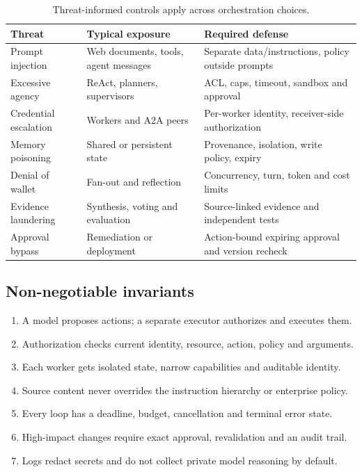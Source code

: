 \begin{table}[htbp]\small\centering
\begin{tabularx}{\linewidth}{@{}p{25mm}Y Y@{}}\toprule
\textbf{Threat} & \textbf{Typical exposure} & \textbf{Required defense}\\\midrule
Prompt injection & Web documents, tools, agent messages & Separate data/instructions, policy outside prompts\\
Excessive agency & ReAct, planners, supervisors & ACL, caps, timeout, sandbox and approval\\
Credential escalation & Workers and A2A peers & Per-worker identity, receiver-side authorization\\
Memory poisoning & Shared or persistent state & Provenance, isolation, write policy, expiry\\
Denial of wallet & Fan-out and reflection & Concurrency, turn, token and cost limits\\
Evidence laundering & Synthesis, voting and evaluation & Source-linked evidence and independent tests\\
Approval bypass & Remediation or deployment & Action-bound expiring approval and version recheck\\\bottomrule
\end{tabularx}
\caption{Threat-informed controls apply across orchestration choices.}
\end{table}

\subsection{Non-negotiable invariants}
\begin{enumerate}
\item A model proposes actions; a separate executor authorizes and executes them.
\item Authorization checks current identity, resource, action, policy and arguments.
\item Each worker gets isolated state, narrow capabilities and auditable identity.
\item Source content never overrides the instruction hierarchy or enterprise policy.
\item Every loop has a deadline, budget, cancellation and terminal error state.
\item High-impact changes require exact approval, revalidation and an audit trail.
\item Logs redact secrets and do not collect private model reasoning by default.
\end{enumerate}
